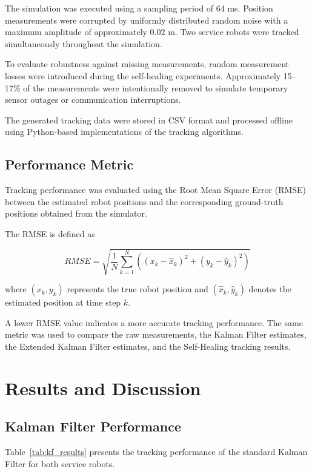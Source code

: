 \documentclass[conference]{IEEEtran}
\begin{document}
The simulation was executed using a sampling period of 64 ms. Position measurements were corrupted by uniformly distributed random noise with a maximum amplitude of approximately 0.02 m. Two service robots were tracked simultaneously throughout the simulation.

To evaluate robustness against missing measurements, random measurement losses were introduced during the self-healing experiments. Approximately 15--17\% of the measurements were intentionally removed to simulate temporary sensor outages or communication interruptions.

The generated tracking data were stored in CSV format and processed offline using Python-based implementations of the tracking algorithms.

\subsection{Performance Metric}

Tracking performance was evaluated using the Root Mean Square Error (RMSE) between the estimated robot positions and the corresponding ground-truth positions obtained from the simulator.

The RMSE is defined as

\begin{equation}
RMSE =
\sqrt{
\frac{1}{N}
\sum_{k=1}^{N}
\left(
(x_k-\hat{x}_k)^2
+
(y_k-\hat{y}_k)^2
\right)
}
\end{equation}

where $(x_k,y_k)$ represents the true robot position and $(\hat{x}_k,\hat{y}_k)$ denotes the estimated position at time step $k$.

A lower RMSE value indicates a more accurate tracking performance. The same metric was used to compare the raw measurements, the Kalman Filter estimates, the Extended Kalman Filter estimates, and the Self-Healing tracking results. 



\section{Results and Discussion}

\subsection{Kalman Filter Performance}



Table~\ref{tab:kf_results} presents the tracking performance of the standard Kalman Filter for both service robots.
\end{document}
